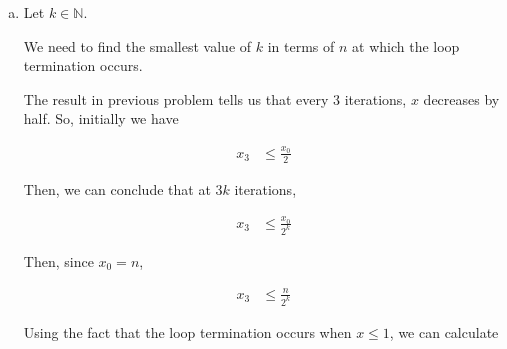 \documentclass[12pt]{article}
\begin{document}
\begin{enumerate}[a.]
\begin{proof}
        \begin{align}
            \frac{2 \cdot (x_{3k} - 1)}{2} &= x_{3k} - 1
        \end{align}

        \bigskip

        On the final iteration, because we know $x_{3k} - 1$ is an even number,
        we can conclude the if condition \textbf{$x \mod 2$ == 0} is true, and
        the line \textbf{x = x // 2} will run.

        \bigskip

        Then, at the end of final iteration, we can conclude $x_{3(k+1)}$ will
        have the value of

        \begin{align}
            x_{3(k+1)} &= \frac{x_{3k} - 1}{2}\\
            &\leq \frac{x_{3k}}{2}
        \end{align}

    \end{proof}

    \item

    Let $k \in \mathbb{N}$.

    \bigskip

    We need to find the smallest value of $k$ in terms of $n$ at which the loop
    termination occurs.

    \bigskip

    The result in previous problem tells us that every 3 iterations, $x$ decreases
    by half. So, initially we have

    \setcounter{equation}{0}
    \begin{align}
        x_3 &\leq \frac{x_0}{2}
    \end{align}

    \bigskip

    Then, we can conclude that at $3k$ iterations,

    \begin{align}
        x_3 &\leq \frac{x_0}{2^k}
    \end{align}

    \bigskip

    Then, since $x_0 = n$,

    \begin{align}
        x_3 &\leq \frac{n}{2^k}
    \end{align}

    \bigskip

    Using the fact that the loop termination occurs when $x \leq 1$, we can
    calculate


\end{enumerate}
\end{document}
